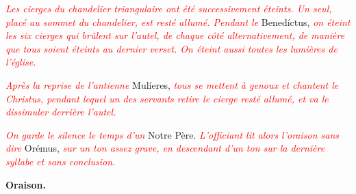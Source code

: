 \documentclass[11pt,twoside]{article} %
\begin{document}
\textcolor{red}{\itshape Les cierges du chandelier triangulaire ont été
successivement éteints. Un seul, placé au sommet du chandelier, est resté allumé.
Pendant le} Benedíctus, \textcolor{red}{\itshape on éteint les six cierges qui
brûlent sur l’autel, de chaque côté alternativement, de manière que tous soient
éteints au dernier verset. On éteint aussi toutes les lumières de l’église.}

\textcolor{red}{\itshape Après la reprise de l’antienne} Mulíeres, %
\textcolor{red}{\itshape tous se mettent à genoux et chantent le Christus, %
pendant lequel un des servants retire le cierge resté allumé, et va le dissimuler
derrière l’autel.}

\nopagebreak
{}
\nopagebreak


\textcolor{red}{\itshape On garde le silence le temps d’un} Notre Père. %
\textcolor{red}{\itshape L’officiant lit alors l’oraison sans dire} Orémus, %
\textcolor{red}{\itshape sur un ton assez grave, en descendant d’un ton sur
la dernière syllabe et sans conclusion.}


\begin{center}
\textbf{Oraison.}
\end{center}





\finoffice

\newpage


\begin{appendices}

\label{Lect_I}

\newpage
\label{Lect_II}

\newpage
\label{Lect_III}

\newpage
\label{Lect_IV}

\newpage
\label{Lect_V}

\newpage
\label{Lect_VI}

\newpage
\label{Lect_VII}

\newpage
\label{Lect_VIII}

\newpage
\label{Lect_IX}

\end{appendices}



\end{document}
